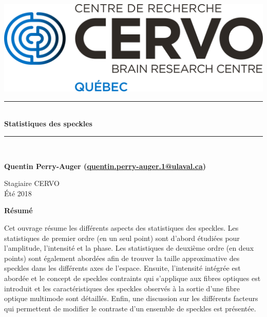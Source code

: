 \documentclass{article}       %
\newcommand{\HRule}{\rule{\linewidth}{0.5mm}}
\begin{document}

\begin{titlepage}  %
\begin{center}   %
\includegraphics[scale=0.5]{fig/logo.png}\\
\vspace{1cm}


\HRule\\[0.4cm]
{\large\bfseries Statistiques des speckles}
\HRule\\[1.75cm]


\vfill

{\bfseries Quentin Perry-Auger (\url{quentin.perry-auger.1@ulaval.ca})}

\vfill

Stagiaire CERVO\\ Été 2018


\vfill

\end{center}

\textbf{\Large Résumé}

Cet ouvrage résume les différents aspects des statistiques des speckles. Les statistiques de premier ordre (en un seul point) sont d'abord étudiées pour l'amplitude, l'intensité et la phase. Les statistiques de deuxième ordre (en deux points) sont également abordées afin de trouver la taille approximative des speckles dans les différents axes de l'espace. Ensuite, l'intensité intégrée est abordée et le concept de speckles contraints qui s'applique aux fibres optiques est introduit et les caractéristiques des speckles observés à la sortie d'une fibre optique multimode sont détaillés. Enfin, une discussion sur les différents facteurs qui permettent de modifier le contraste d'un ensemble de speckles est présentée.

\end{titlepage}
\end{document}
